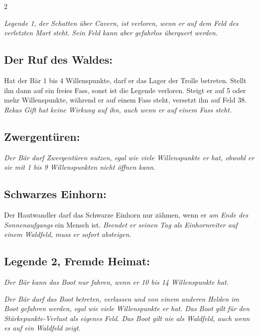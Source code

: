 \documentclass[10pt, a4paper, oneside]{book}
\newcommand{\fan}[1]{\textit{#1}}
\begin{document}
\begin{multicols*}{2}
\begin{bgcolor}[color-dz]
\bullet{} \fan{Legende 1, der Schatten über Cavern, ist verloren, wenn er auf dem Feld des verletzten Mart steht. Sein Feld kann aber gefahrlos überquert werden.}



\subsection{Der Ruf des Waldes:}

Hat der Bär 1 bis 4 Willenspunkte, darf er das Lager der Trolle betreten. Stellt ihn dann auf ein freies Fass, sonst ist die Legende verloren. Steigt er auf 5 oder mehr Willenspunkte, während er auf einem Fass steht, versetzt ihn auf Feld 38. 
\supercite{dz-begleitheft}
\fan{Rekas Gift hat keine Wirkung auf ihn, auch wenn er auf einem Fass steht.}





\subsection{Zwergentüren:}

\fan{Der Bär darf Zwergentüren nutzen, egal wie viele Willenspunkte er hat, obwohl er sie mit 1 bis 9 Willenspunkten nicht öffnen kann.}




\subsection{Schwarzes Einhorn:}

Der Hautwandler darf das Schwarze Einhorn nur zähmen, wenn er \fan{am Ende des Sonnenaufgangs} ein Mensch ist.
\supercite{dz-begleitheft}
\fan{Beendet er seinen Tag als Einhornreiter auf einem Waldfeld, muss er sofort absteigen.}






\subsection{Legende 2, Fremde Heimat:}

\fan{Der Bär kann das Boot nur fahren, wenn er 10 bis 14 Willenspunkte hat.}

\fan{Der Bär darf das Boot betreten, verlassen und von einem anderen Helden im Boot gefahren werden, egal wie viele Willenspunkte er hat. Das Boot gilt für den Stärkepunkte-Verlust als eigenes Feld. Das Boot gilt nie als Waldfeld, auch wenn es auf ein Waldfeld zeigt.}





\end{bgcolor}
\end{multicols*}
\end{document}
